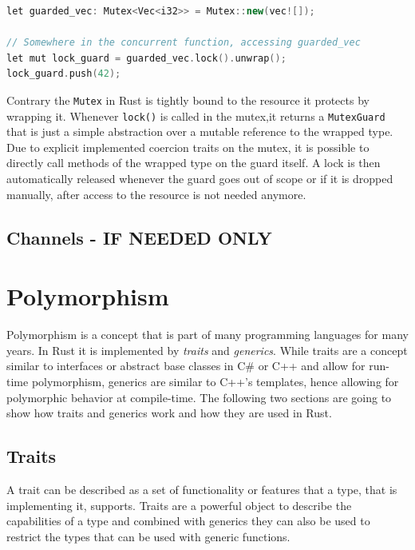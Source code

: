 \begin{lstlisting}[caption={Usage of a std::sync::Mutex to guard a shared resource in Rust}, label={lst:rust_mutex}, language=C++]
let guarded_vec: Mutex<Vec<i32>> = Mutex::new(vec![]);

// Somewhere in the concurrent function, accessing guarded_vec
let mut lock_guard = guarded_vec.lock().unwrap();
lock_guard.push(42);
\end{lstlisting}

\noindent
Contrary the \texttt{Mutex} in Rust is tightly bound to the resource it protects by wrapping it. Whenever \texttt{lock()} is called in the mutex,it returns a \texttt{MutexGuard} that is just a simple abstraction over a mutable reference to the wrapped type. Due to explicit implemented coercion traits on the mutex, it is possible to directly call methods of the wrapped type on the guard itself. A lock is then automatically released whenever the guard goes out of scope or if it is dropped manually, after access to the resource is not needed anymore.

\subsection{Channels - IF NEEDED ONLY}
\blindtext

\section{Polymorphism}

Polymorphism is a concept that is part of many programming languages for many years. In Rust it is implemented by \textit{traits} and \textit{generics}. While traits are a concept similar to interfaces or abstract base classes in C\# or C++ and allow for run-time polymorphism, generics are similar to C++'s templates, hence allowing for polymorphic behavior at compile-time. The following two sections are going to show how traits and generics work and how they are used in Rust.

\subsection{Traits}

A trait can be described as a set of functionality or features that a type, that is implementing it, supports. Traits are a powerful object to describe the capabilities of a type and combined with generics they can also be used to restrict the types that can be used with generic functions.\\

